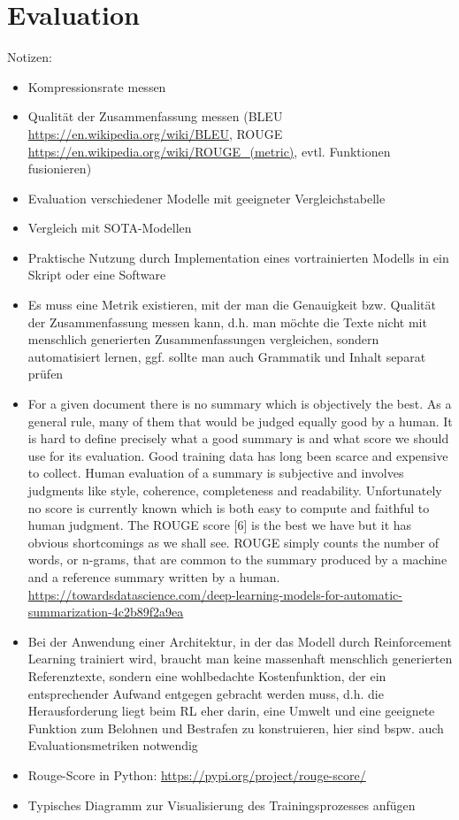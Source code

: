\section{Evaluation}
Notizen:
\begin{itemize}
	\item Kompressionsrate messen
	\item Qualität der Zusammenfassung messen (BLEU \url{https://en.wikipedia.org/wiki/BLEU}, ROUGE \url{https://en.wikipedia.org/wiki/ROUGE_(metric)}, evtl. Funktionen fusionieren)
	\item Evaluation verschiedener Modelle mit geeigneter Vergleichstabelle
	\item Vergleich mit SOTA-Modellen
	\item Praktische Nutzung durch Implementation eines vortrainierten Modells in ein Skript oder eine Software
	\item Es muss eine Metrik existieren, mit der man die Genauigkeit bzw. Qualität der Zusammenfassung messen kann, d.h. man möchte die Texte nicht mit menschlich generierten Zusammenfassungen vergleichen, sondern automatisiert lernen, ggf. sollte man auch Grammatik und Inhalt separat prüfen
	\item For a given document there is no summary which is objectively the best. As a general rule, many of them that would be judged equally good by a human. It is hard to define precisely what a good summary is and what score we should use for its evaluation. Good training data has long been scarce and expensive to collect. Human evaluation of a summary is subjective and involves judgments like style, coherence, completeness and readability. Unfortunately no score is currently known which is both easy to compute and faithful to human judgment. The ROUGE score [6] is the best we have but it has obvious shortcomings as we shall see. ROUGE simply counts the number of words, or n-grams, that are common to the summary produced by a machine and a reference summary written by a human. \url{https://towardsdatascience.com/deep-learning-models-for-automatic-summarization-4c2b89f2a9ea}
	\item Bei der Anwendung einer Architektur, in der das Modell durch Reinforcement Learning trainiert wird, braucht man keine massenhaft menschlich generierten Referenztexte, sondern eine wohlbedachte Kostenfunktion, der ein entsprechender Aufwand entgegen gebracht werden muss, d.h. die Herausforderung liegt beim RL eher darin, eine Umwelt und eine geeignete Funktion zum Belohnen und Bestrafen zu konstruieren, hier sind bspw. auch Evaluationsmetriken notwendig
	\item Rouge-Score in Python: \url{https://pypi.org/project/rouge-score/}
	\item Typisches Diagramm zur Visualisierung des Trainingsprozesses anfügen
\end{itemize}
